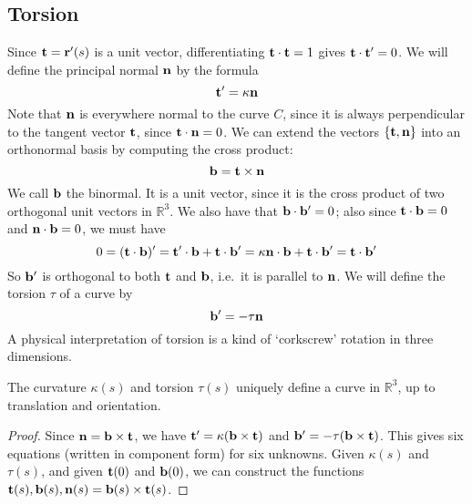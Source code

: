 \subsection{Torsion}
Since \(\vb t = \vb r'(s)\) is a unit vector, differentiating \(\vb t \cdot \vb t = 1\) gives \(\vb t \cdot \vb t' = 0\).
We will define the principal normal \(\vb n\) by the formula
\[
	\vb t' = \kappa \vb n
\]
Note that \(\vb n\) is everywhere normal to the curve \(C\), since it is always perpendicular to the tangent vector \(\vb t\), since \(\vb t \cdot \vb n = 0\).
We can extend the vectors \(\{ \vb t, \vb n \}\) into an orthonormal basis by computing the cross product:
\[
	\vb b = \vb t \times \vb n
\]
We call \(\vb b\) the binormal.
It is a unit vector, since it is the cross product of two orthogonal unit vectors in \(\mathbb R^3\).
We also have that \(\vb b \cdot \vb b' = 0\); also since \(\vb t \cdot \vb b = 0\) and \(\vb n \cdot \vb b = 0\), we must have
\[
	0 = (\vb t \cdot \vb b)' = \vb t' \cdot \vb b + \vb t \cdot \vb b' = \kappa \vb n \cdot \vb b + \vb t \cdot \vb b' = \vb t \cdot \vb b'
\]
So \(\vb b'\) is orthogonal to both \(\vb t\) and \(\vb b\), i.e.\ it is parallel to \(\vb n\).
We will define the torsion \(\tau\) of a curve by
\[
	\vb b' = -\tau \vb n
\]
A physical interpretation of torsion is a kind of `corkscrew' rotation in three dimensions.

\begin{proposition}
	The curvature \(\kappa(s)\) and torsion \(\tau(s)\) uniquely define a curve in \(\mathbb R^3\), up to translation and orientation.
\end{proposition}
\begin{proof}
	Since \(\vb n = \vb b \times \vb t\), we have \(\vb t' = \kappa(\vb b \times \vb t)\) and \(\vb b' = -\tau(\vb b \times \vb t)\).
	This gives six equations (written in component form) for six unknowns.
	Given \(\kappa(s)\) and \(\tau(s)\), and given \(\vb t(0)\) and \(\vb b(0)\), we can construct the functions \(\vb t(s), \vb b(s), \vb n(s) = \vb b(s) \times \vb t(s)\).
\end{proof}

